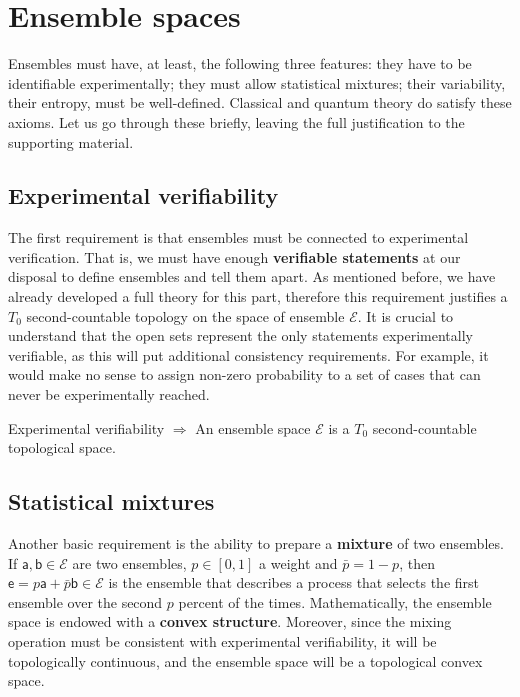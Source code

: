 \documentclass[10pt,twocolumn, nofootinbib]{revtex4-2}
\newcommand{\ens}[1][e] {\mathsf{#1}} %
\newcommand{\Ens}[1][E] {\mathcal{#1}} %
\begin{document}
\section{Ensemble spaces}

Ensembles must have, at least, the following three features: they have to be identifiable experimentally; they must allow statistical mixtures; their variability, their entropy, must be well-defined. Classical and quantum theory do satisfy these axioms. Let us go through these briefly, leaving the full justification to the supporting material.

\subsection{Experimental verifiability}
The first requirement is that ensembles must be connected to experimental verification. That is, we must have enough \textbf{verifiable statements} at our disposal to define ensembles and tell them apart. As mentioned before, we have already developed a full theory for this part, therefore this requirement justifies a $T_0$ second-countable topology on the space of ensemble $\Ens$. It is crucial to understand that the open sets represent the only statements experimentally verifiable, as this will put additional consistency requirements. For example, it would make no sense to assign non-zero probability to a set of cases that can never be experimentally reached.

\begin{tcolorbox}[colback=white, colframe=black]
	Experimental verifiability $\Rightarrow$ An ensemble space $\Ens$ is a $T_0$ second-countable topological space.
\end{tcolorbox}


\subsection{Statistical mixtures}
Another basic requirement is the ability to prepare a \textbf{mixture} of two ensembles. If $\ens[a], \ens[b] \in \Ens$ are two ensembles, $p \in [0,1]$ a weight and $\bar{p} = 1-p$, then $\ens = p \ens[a] + \bar{p} \ens[b] \in \Ens$ is the ensemble that describes a process that selects the first ensemble over the second $p$ percent of the times. Mathematically, the ensemble space is endowed with a \textbf{convex structure}. Moreover, since the mixing operation must be consistent with experimental verifiability, it will be topologically continuous, and the ensemble space will be a topological convex space.
\end{document}

